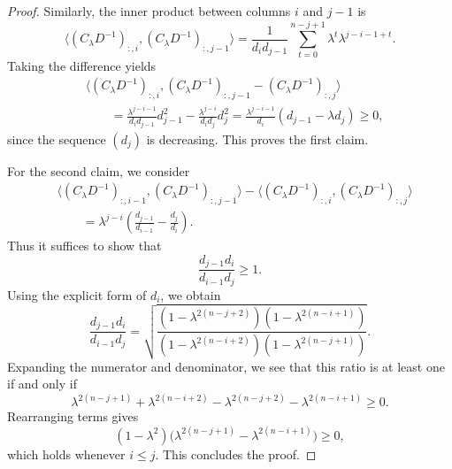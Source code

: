 \documentclass{article}
\theoremstyle{plain}
\theoremstyle{definition}
\theoremstyle{remark}
\begin{document}
\begin{proof}
Similarly, the inner product between columns $i$ and $j-1$ is
\begin{equation}
    \langle (C_\lambda D^{-1})_{:,i}, (C_\lambda D^{-1})_{:,j-1} \rangle
    =
    \frac{1}{d_i d_{j-1}}
    \sum_{t=0}^{n-j+1} \lambda^{t} \lambda^{j-i-1+t}.
\end{equation}
Taking the difference yields
\begin{align}
    &\langle (C_\lambda D^{-1})_{:,i}, (C_\lambda D^{-1})_{:,j-1} - (C_\lambda D^{-1})_{:,j} \rangle \\
    &\qquad
    = \frac{\lambda^{j-i-1}}{d_i d_{j-1}} d_{j-1}^2
      - \frac{\lambda^{j-i}}{d_i d_j} d_j^2
    = \frac{\lambda^{j-i-1}}{d_i} (d_{j-1} - \lambda d_j) \ge 0,
\end{align}
since the sequence $(d_j)$ is decreasing. This proves the first claim.

For the second claim, we consider
\begin{align}
    &\langle (C_\lambda D^{-1})_{:,i-1}, (C_\lambda D^{-1})_{:,j-1} \rangle
    - \langle (C_\lambda D^{-1})_{:,i}, (C_\lambda D^{-1})_{:,j} \rangle \\
    &\qquad
    = \lambda^{j-i}
    \left(
        \frac{d_{j-1}}{d_{i-1}} - \frac{d_j}{d_i}
    \right).
\end{align}
Thus it suffices to show that
\[
    \frac{d_{j-1} d_i}{d_{i-1} d_j} \ge 1.
\]
Using the explicit form of $d_i$, we obtain
\begin{equation}
    \frac{d_{j-1} d_i}{d_{i-1} d_j}
    =
    \sqrt{
        \frac{
            (1-\lambda^{2(n-j+2)})(1-\lambda^{2(n-i+1)})
        }{
            (1-\lambda^{2(n-i+2)})(1-\lambda^{2(n-j+1)})
        }
    }.
\end{equation}
Expanding the numerator and denominator, we see that this ratio is at least one if and only if
\begin{equation}
    \lambda^{2(n - j + 1)} + \lambda^{2(n - i + 2)}
    -
     \lambda^{2(n - j + 2)} - \lambda^{2(n - i + 1)}
    \ge 0.
\end{equation}
Rearranging terms gives
\begin{equation}
    (1 - \lambda^2)
    \bigl(
        \lambda^{2(n - j + 1)} - \lambda^{2(n - i + 1)}
    \bigr)
    \ge 0,
\end{equation}
which holds whenever $i \le j$. This concludes the proof.
\end{proof}


\rmseComparisonLemma*
\end{document}
